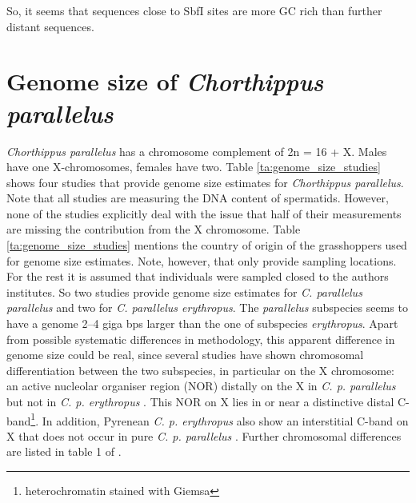 \documentclass[a4paper,12pt,times,print,index, custombib]{PhDThesisPSnPDF}\usepackage[]{graphicx}\usepackage[]{color}
\begin{document}
So, it seems that sequences close to \gls{SbfI} sites are more GC rich than further distant sequences. 

\FloatBarrier
\section{Genome size of \textit{Chorthippus parallelus}}\label{ch:Genome_size}

\textit{Chorthippus parallelus} has a chromosome complement of 2n = 16 + X. Males have one X-chromosomes, females have two. Table \ref{ta:genome_size_studies} shows four studies that provide genome size estimates for \textit{Chorthippus parallelus}. Note that all studies are measuring the DNA content of spermatids. However, none of the studies explicitly deal with the issue that half of their measurements are missing the contribution from the X chromosome. Table \ref{ta:genome_size_studies} mentions the country of origin of the grasshoppers used for genome size estimates. Note, however, that only \cite{Belda1991} provide sampling locations. For the rest it is assumed that individuals were sampled closed to the authors institutes. So two studies provide genome size estimates for \textit{C. parallelus parallelus} and two for \textit{C. parallelus erythropus}. The \textit{parallelus} subspecies seems to have a genome 2--4 giga \glspl{bp} larger than the one of subspecies \textit{erythropus}. Apart from possible systematic differences in methodology, this apparent difference in genome size could be real, since several studies have shown chromosomal differentiation between the two subspecies, in particular on the X chromosome: an active nucleolar organiser region (NOR) distally on the X in \textit{C. p. parallelus} but not in \textit{C. p. erythropus} \citep{Gosalvez1988}. This NOR on X lies in or near a distinctive distal C-band\footnote{\gls{heterochromatin} stained with Giemsa}. In addition, Pyrenean \textit{C. p. erythropus} also show an interstitial C-band on X that does not occur in pure \textit{C. p. parallelus} \citep{Bella2007}. Further chromosomal differences are listed in table 1 of \cite{Ferris1993}.
\end{document}
